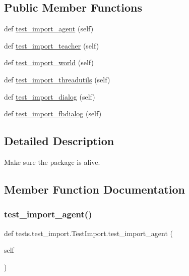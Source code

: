 \subsection*{Public Member Functions}
\begin{DoxyCompactItemize}
\item 
def \hyperlink{classtests_1_1test__import_1_1TestImport_acfd2119a3ad738cad370cf72ef7e7423}{test\+\_\+import\+\_\+agent} (self)
\item 
def \hyperlink{classtests_1_1test__import_1_1TestImport_af48db1b740c81424df27e10c66481770}{test\+\_\+import\+\_\+teacher} (self)
\item 
def \hyperlink{classtests_1_1test__import_1_1TestImport_a7eb4091dcd3395e147659ec3a49be488}{test\+\_\+import\+\_\+world} (self)
\item 
def \hyperlink{classtests_1_1test__import_1_1TestImport_a3a90634703bb67d0bb0b3ac5352657ad}{test\+\_\+import\+\_\+threadutils} (self)
\item 
def \hyperlink{classtests_1_1test__import_1_1TestImport_a5dcc13dee044ad4be07523f024b13db2}{test\+\_\+import\+\_\+dialog} (self)
\item 
def \hyperlink{classtests_1_1test__import_1_1TestImport_ad030b185d0f0b02e1d8606d578d48820}{test\+\_\+import\+\_\+fbdialog} (self)
\end{DoxyCompactItemize}


\subsection{Detailed Description}
\begin{DoxyVerb}Make sure the package is alive.
\end{DoxyVerb}
 

\subsection{Member Function Documentation}
\mbox{\label{classtests_1_1test__import_1_1TestImport_acfd2119a3ad738cad370cf72ef7e7423}} 
\subsubsection{\texorpdfstring{test\+\_\+import\+\_\+agent()}{test\_import\_agent()}}
{\footnotesize\ttfamily def tests.\+test\+\_\+import.\+Test\+Import.\+test\+\_\+import\+\_\+agent (\begin{DoxyParamCaption}\item[{}]{self }\end{DoxyParamCaption})}


